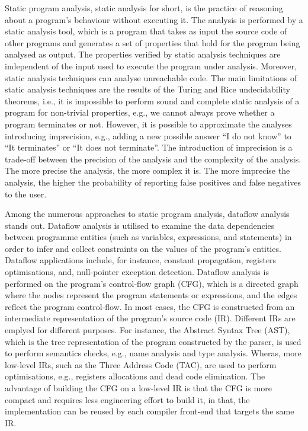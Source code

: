 Static program analysis, static analysis for short, is the practice of reasoning
about a program's behaviour without executing it. The analysis is performed by a static analysis tool,
which is a program that takes as input the source code of other programs and
generates a set of properties that hold for the program being analysed as output.
The properties verified by static analysis techniques are independent of the input
used to execute the program under analysis. Moreover, static analysis techniques can analyse unreachable code.
The main limitations of static analysis techniques are the results of the Turing and Rice undecidability
theorems, i.e., it is impossible to perform sound and complete static analysis of a program for non-trivial properties, e.g., 
we cannot always prove whether a program terminates or not. However, it is possible
to approximate the analyses introducing imprecision, e.g., adding a new possible answer
``I do not know'' to  ``It terminates'' or ``It does not terminate''. The introduction 
of imprecision is a trade-off between the precision of the analysis and the complexity
of the analysis. The more precise the analysis, the more complex it is. 
The more imprecise the analysis, the higher the probability of reporting 
false positives and false negatives to the user. 


Among the numerous approaches to static program analysis, dataflow analysis stands out.
Dataflow analysis is utilised to examine the data dependencies between programme entities
(such as variables, expressions, and statements) in order to infer and collect constraints
on the values of the program's entities. Dataflow applications include, for instance,
constant propagation, registers optimisations, and, null-pointer exception detection.
Dataflow analysis is performed on the program's control-flow graph (CFG), which is a
directed graph where the nodes represent the program statements or expressions,
and the edges reflect the program control-flow. In most cases, the CFG is constructed 
from an intermediate representation of the program's source code (IR).
Different IRs are emplyed for different purposes. For instance, the Abstract Syntax Tree (AST), which
is the tree representation of the program constructed by the parser, is used to perform semantics checks, e.g.,
name analysis and type analysis. Wheras, more low-level IRs, such as the Three Address Code (TAC),
are used to perform optimisations, e.g., registers allocations and dead code elimination. The advantage
of building the CFG on a low-level IR is that the CFG is more compact and requires 
less engineering effort to build it, in that, the implementation can be reused by each 
compiler front-end that targets the same IR.







